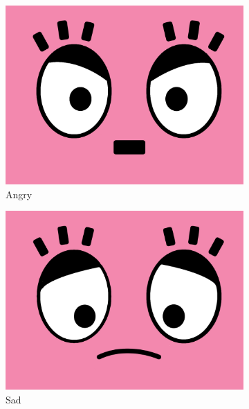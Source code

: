\documentclass[12pt]{article}
\begin{document}
\begin{figure}[!htbp]
\begin{subfigure}[b]{0.23\textwidth}
    \centering
    \includegraphics[width=\textwidth]{1.png}
    \caption{Angry}
    \label{angry}
    \end{subfigure}
    \begin{subfigure}[b]{0.23\textwidth}
    \centering
    \includegraphics[width=\textwidth]{7.png}
    \caption{Sad}
    \label{sad}
    \end{subfigure}
    \begin{subfigure}[b]{0.23\textwidth}
    \centering

\end{subfigure}
\end{figure}
\end{document}
